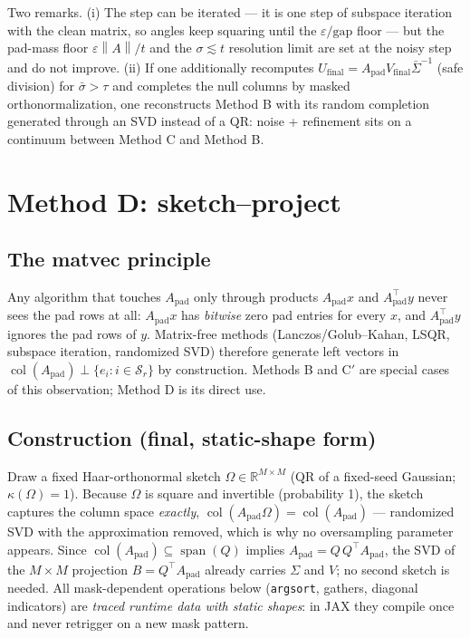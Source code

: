 \documentclass[11pt]{article}
\newcommand{\R}{\mathbb{R}}
\newcommand{\Apad}{A_{\mathrm{pad}}}
\newcommand{\norm}[1]{\left\lVert #1 \right\rVert}
\begin{document}
Two remarks. (i) The step can be iterated --- it is one step of subspace
iteration with the clean matrix, so angles keep squaring until the
$\varepsilon/\mathrm{gap}$ floor --- but the pad-mass floor
$\varepsilon\norm{A}/t$ and the $\sigma \lesssim t$ resolution limit are set at
the noisy step and do not improve. (ii) If one additionally recomputes
$U_{\mathrm{final}} = \Apad V_{\mathrm{final}} \bar\Sigma^{-1}$ (safe division)
for $\bar\sigma > \tau$ and completes the null columns by masked
orthonormalization, one reconstructs Method B with its random completion
generated through an SVD instead of a QR: noise + refinement sits on a
continuum between Method C and Method B.

\section{Method D: sketch--project}\label{sec:methodD}

\subsection*{The matvec principle}

Any algorithm that touches $\Apad$ only through products $\Apad x$ and
$\Apad^{\top} y$ never sees the pad rows at all: $\Apad x$ has \emph{bitwise}
zero pad entries for every $x$, and $\Apad^{\top} y$ ignores the pad rows of
$y$. Matrix-free methods (Lanczos/Golub--Kahan, LSQR, subspace iteration,
randomized SVD) therefore generate left vectors in
$\operatorname{col}(\Apad) \perp \{e_i : i \in \mathcal{S}_r\}$ by
construction. Methods B and C$'$ are special cases of this observation;
Method D is its direct use.

\subsection*{Construction (final, static-shape form)}

Draw a fixed Haar-orthonormal sketch $\Omega \in \R^{M \times M}$ (QR of a
fixed-seed Gaussian; $\kappa(\Omega)=1$). Because $\Omega$ is square and
invertible (probability 1), the sketch captures the column space
\emph{exactly}, $\operatorname{col}(\Apad\Omega) = \operatorname{col}(\Apad)$
--- randomized SVD with the approximation removed, which is why no
oversampling parameter appears. Since
$\operatorname{col}(\Apad) \subseteq \operatorname{span}(Q)$ implies
$\Apad = Q\,Q^{\top}\Apad$, the SVD of the $M \times M$ projection
$B = Q^{\top}\Apad$ already carries $\Sigma$ and $V$; no second sketch is
needed. All mask-dependent operations below (\texttt{argsort}, gathers,
diagonal indicators) are \emph{traced runtime data with static shapes}: in
JAX they compile once and never retrigger on a new mask pattern.
\end{document}

